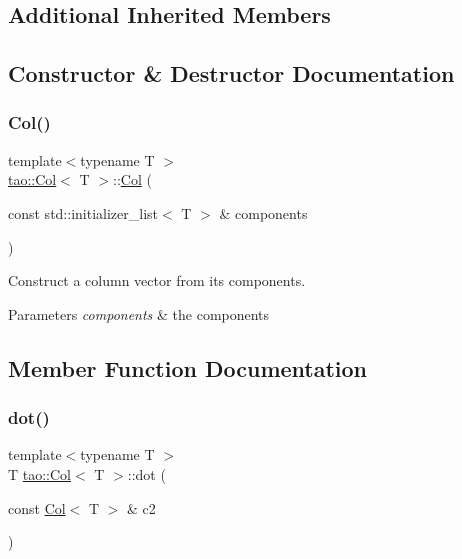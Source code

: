 \subsection*{Additional Inherited Members}


\subsection{Constructor \& Destructor Documentation}
\mbox{\label{classtao_1_1_col_a9133bec2b352e2e139e51e1f9107473d}} 
\subsubsection{\texorpdfstring{Col()}{Col()}}
{\footnotesize\ttfamily template$<$typename T $>$ \\
\mbox{\hyperlink{classtao_1_1_col}{tao\+::\+Col}}$<$ T $>$\+::\mbox{\hyperlink{classtao_1_1_col}{Col}} (\begin{DoxyParamCaption}\item[{const std\+::initializer\+\_\+list$<$ T $>$ \&}]{components }\end{DoxyParamCaption})}



Construct a column vector from its components. 


\begin{DoxyParams}{Parameters}
{\em components} & the components \\
\hline
\end{DoxyParams}


\subsection{Member Function Documentation}
\mbox{\label{classtao_1_1_col_a605b320d536f27395162eff375af8514}} 
\subsubsection{\texorpdfstring{dot()}{dot()}}
{\footnotesize\ttfamily template$<$typename T $>$ \\
T \mbox{\hyperlink{classtao_1_1_col}{tao\+::\+Col}}$<$ T $>$\+::dot (\begin{DoxyParamCaption}\item[{const \mbox{\hyperlink{classtao_1_1_col}{Col}}$<$ T $>$ \&}]{c2 }\end{DoxyParamCaption})}



